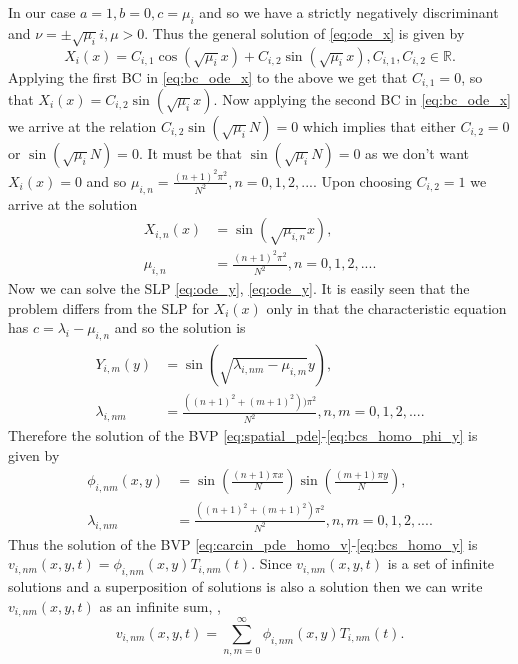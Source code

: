 \documentclass[\main/thesis.tex]{subfiles}
\begin{document}
In our case $a {=} 1, b {=} 0, c {=} \mu_i$ and so we have a strictly negatively discriminant and $\nu {=} {\pm}\sqrt{\mu_i}i, \mu {>} 0$. Thus the general solution of \eqref{eq:ode_x} is given by
\begin{equation*}
X_i(x) {=} C_{i,1}\cos(\sqrt{\mu_i} x) + C_{i,2}\sin(\sqrt{\mu_i} x), C_{i,1}, C_{i,2} {\in} \mathbb{R}.
\end{equation*}
Applying the first BC in \eqref{eq:bc_ode_x} to the above we get that $C_{i,1} {=} 0$, so that $X_i(x) {=} C_{i,2}\sin(\sqrt{\mu_i} x)$. Now applying the second BC in \eqref{eq:bc_ode_x} we arrive at 
the relation $C_{i,2}\sin(\sqrt{\mu_i} N) {=} 0$ which implies that either $C_{i,2} {=} 0$ or $\sin(\sqrt{\mu_i} N) {=} 0$. It must be that $\sin(\sqrt{\mu_i} N) {=} 0$ as we don't want $X_i(x) {=} 0$ 
and so \newline
$\mu_{i,n} {=} \frac{(n+1)^2\pi^2}{N^2}, n {=} 0, 1, 2, ...$. Upon choosing $C_{i,2} {=} 1$ we arrive at the solution
\begin{align*}
X_{i,n}(x) &{=} \sin(\sqrt{\mu_{i,n}} x), \\
\mu_{i,n} &{=} \frac{(n+1)^2\pi^2}{N^2}, n {=} 0, 1, 2, ....
\end{align*}
Now we can solve the SLP \eqref{eq:ode_y}, \eqref{eq:ode_y}. It is easily seen that the problem differs from the SLP for $X_i(x)$ only in that the characteristic equation has 
$c {=} \lambda_i {-} \mu_{i, n}$ and so the solution is
\begin{align*}
Y_{i,m}(y) &{=} \sin(\sqrt{\lambda_{i, nm}{-}\mu_{i, m}} y), \\
\lambda_{i, nm} &{=} \frac{((n+1)^2 {+} (m+1)^2))\pi^2}{N^2}, n,m {=} 0, 1, 2, ....
\end{align*}
Therefore the solution of the BVP \eqref{eq:spatial_pde}-\eqref{eq:bcs_homo_phi_y} is given by
\begin{align}
\phi_{i,nm}(x, y) &{=} \sin\left( \frac{(n+1)\pi x}{N} \right) \sin\left( \frac{(m+1)\pi y}{N} \right),
\label{eq:spatial_sol} \\
\lambda_{i, nm} &{=} \frac{((n+1)^2 {+} (m+1)^2)\pi^2}{N^2}, n,m {=} 0, 1, 2, ....
\label{eq:sep_const}
\end{align}
Thus the solution of the BVP \eqref{eq:carcin_pde_homo_v}-\eqref{eq:bcs_homo_y} is $v_{i,nm}(x, y, t) {=} \phi_{i,nm}(x, y)T_{i,nm}(t)$. Since $v_{i,nm}(x, y, t)$ is a set of infinite solutions and a 
superposition of solutions is also a solution then we can write $v_{i,nm}(x, y, t)$ as an infinite sum, \ie,
\begin{equation}
v_{i,nm}(x, y, t) {=} \sum_{n,m {=} 0}^{\infty} \phi_{i,nm}(x, y)T_{i,nm}(t).
\label{eq:variable_sol}
\end{equation}
\end{document}
